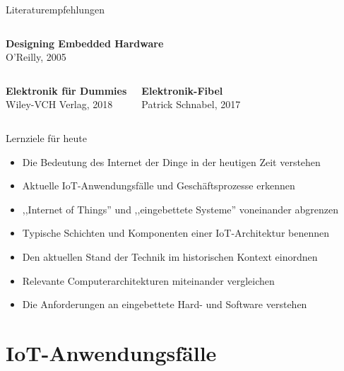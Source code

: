 {\begin{frame}{Literaturempfehlungen}
\begin{columns}
        \textbf{Designing Embedded Hardware} \\ O'Reilly, 2005
    \end{columns}

    \vskip 0.6cm

    \begin{columns}
        \textbf{Elektronik für Dummies} \\ Wiley-VCH Verlag, 2018

        \textbf{Elektronik-Fibel} \\ Patrick Schnabel, 2017
    \end{columns}
\end{frame}
}

\begin{frame}{Lernziele für heute}
    \begin{itemize}
        \item Die Bedeutung des Internet der Dinge in der heutigen Zeit verstehen
        \item Aktuelle IoT-Anwendungsfälle und Geschäftsprozesse erkennen
        \item ,,Internet of Things'' und ,,eingebettete Systeme'' voneinander abgrenzen
        \item Typische Schichten und Komponenten einer IoT-Architektur benennen
        \item Den aktuellen Stand der Technik im historischen Kontext einordnen
        \item Relevante Computerarchitekturen miteinander vergleichen
        \item Die Anforderungen an eingebettete Hard- und Software verstehen
    \end{itemize}
\end{frame}

\section{IoT-Anwendungsfälle}

